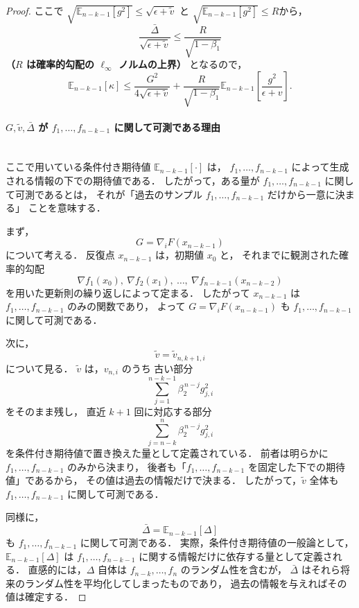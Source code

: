 \documentclass[dvipdfmx,a4paper,11pt]{jsarticle}
\begin{document}
\begin{proof}
ここで $\sqrt{\mathbb{E}_{n-k-1}[g^2]} \leq \sqrt{\epsilon+\tilde{v}}$ と
$\sqrt{\mathbb{E}_{n-k-1}[g^2]} \leq R$から，
\[
  \frac{\bar{\Delta}}{\sqrt{\epsilon+\tilde{v}}}
  \leq \frac{R}{\sqrt{1-\beta_1}}
\]
\textbf{（$R$ は確率的勾配の $\ell_\infty$ ノルムの上界）}
となるので，
\begin{equation}
    \mathbb{E}_{n-k-1}[\kappa]
    \leq \frac{G^2}{4\sqrt{\epsilon+\tilde{v}}}
    + \frac{R}{\sqrt{1-\beta_1}}
      \mathbb{E}_{n-k-1}\!\left[\frac{g^2}{\epsilon+v}\right].
    \tag{A.22'}
    \label{eq:kappa_simplified_Delta}
\end{equation}
\medskip
\noindent
\paragraph{$G,\tilde{v},\bar{\Delta}$ が $f_1,\dots,f_{n-k-1}$ に関して可測である理由}\ \\
\noindent
ここで用いている条件付き期待値
$\mathbb{E}_{n-k-1}[\cdot]$ は，
$f_1,\dots,f_{n-k-1}$ によって生成される情報の下での期待値である．
したがって，ある量が $f_1,\dots,f_{n-k-1}$ に関して可測であるとは，
それが「過去のサンプル $f_1,\dots,f_{n-k-1}$ だけから一意に決まる」
ことを意味する．

まず，
\[
  G = \nabla_i F(x_{n-k-1})
\]
について考える．
反復点 $x_{n-k-1}$ は，初期値 $x_0$ と，
それまでに観測された確率的勾配
\[
  \nabla f_1(x_0),\ \nabla f_2(x_1),\ \dots,\ \nabla f_{n-k-1}(x_{n-k-2})
\]
を用いた更新則の繰り返しによって定まる．
したがって $x_{n-k-1}$ は $f_1,\dots,f_{n-k-1}$ のみの関数であり，
よって $G=\nabla_i F(x_{n-k-1})$ も
$f_1,\dots,f_{n-k-1}$ に関して可測である．

次に，
\[
  \tilde{v}=\tilde{v}_{n,k+1,i}
\]
について見る．
$\tilde{v}$ は，$v_{n,i}$ のうち
古い部分
\[
  \sum_{j=1}^{n-k-1}\beta_2^{\,n-j} g_{j,i}^2
\]
をそのまま残し，
直近 $k+1$ 回に対応する部分
\[
  \sum_{j=n-k}^{n}\beta_2^{\,n-j} g_{j,i}^2
\]
を条件付き期待値で置き換えた量として定義されている．
前者は明らかに $f_1,\dots,f_{n-k-1}$ のみから決まり，
後者も「$f_1,\dots,f_{n-k-1}$ を固定した下での期待値」であるから，
その値は過去の情報だけで決まる．
したがって，$\tilde{v}$ 全体も
$f_1,\dots,f_{n-k-1}$ に関して可測である．

同様に，
\[
  \bar{\Delta}
  = \mathbb{E}_{n-k-1}[\Delta]
\]
も
$f_1,\dots,f_{n-k-1}$ に関して可測である．
実際，条件付き期待値の一般論として，
$\mathbb{E}_{n-k-1}[\Delta]$ は
$f_1,\dots,f_{n-k-1}$ に関する情報だけに依存する量として定義される．
直感的には，$\Delta$ 自体は
$f_{n-k},\dots,f_n$ のランダム性を含むが，
$\bar{\Delta}$ はそれら将来のランダム性を平均化してしまったものであり，
過去の情報を与えればその値は確定する．


\end{proof}
\end{document}
